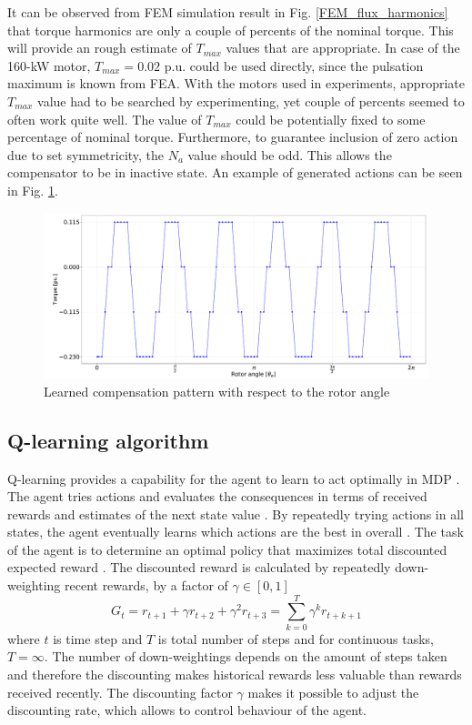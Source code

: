 It can be observed from FEM simulation result in Fig. \ref{FEM_flux_harmonics} that torque harmonics are only a couple of percents of the nominal torque. This will provide an rough estimate of $T_{max}$ values that are appropriate. In case of the 160-kW motor, $T_{max} = 0.02$ p.u. could be used directly, since the pulsation maximum is known from FEA. With the motors used in experiments, appropriate $T_{max}$ value had to be searched by experimenting, yet couple of percents seemed to often work quite well. The value of $T_{max}$ could be potentially fixed to some percentage of nominal torque. Furthermore, to guarantee inclusion of zero action due to set symmetricity, the $N_a$ value should be odd. This allows the compensator to be in inactive state. An example of generated actions can be seen in Fig. \ref{fig:learned_pattern_torque}.
\begin{figure}[htb] 
    \centering
    \includegraphics[width=\textwidth]{images/learned-compensation-pattern.pdf}
    \caption{\small Learned compensation pattern with respect to the rotor angle}
    \label{fig:learned_pattern_torque}
\end{figure}


\subsection{Q-learning algorithm}
Q-learning provides a capability for the agent to learn to act optimally in MDP \cite{RL:Watkins-Q}. The agent tries actions and evaluates the consequences in terms of received rewards and estimates of the next state value \cite{RL:Watkins-Q}. By repeatedly trying actions in all states, the agent eventually learns which actions are the best in overall \cite{RL:Watkins-Q}. The task of the agent is to determine an optimal policy that maximizes total discounted expected reward \cite{RL:Watkins-Q}. The discounted reward is calculated by repeatedly down-weighting recent rewards, by a factor of $\gamma \in [0, 1]$ \cite{RL:Sutton-Barto}
\begin{equation*}
    G_t = r_{t+1} + \gamma r_{t+2} + \gamma^2 r_{t+3} = \sum_{k=0}^{T} \gamma^k r_{t+k+1}
\end{equation*}
where $t$ is time step and $T$ is total number of steps and for continuous tasks, $T = \infty$. The number of down-weightings depends on the amount of steps taken and therefore the discounting makes historical rewards less valuable than rewards received recently. The discounting factor $\gamma$ makes it possible to adjust the discounting rate, which allows to control behaviour of the agent.

